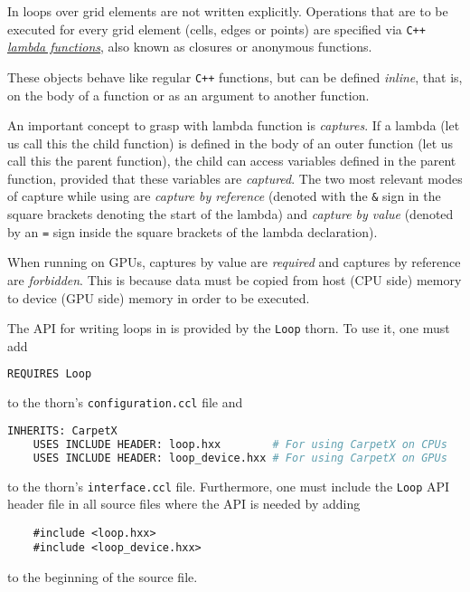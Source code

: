 In \CarpetX\space loops over grid elements are not written explicitly. Operations that are to be executed for every grid element (cells, edges or points) are specified via \texttt{C++} \href{https://en.cppreference.com/w/cpp/language/lambda}{\textit{lambda functions}}, also known as closures or anonymous functions.

These objects behave like regular \texttt{C++} functions, but can be defined \textit{inline}, that is, on the body of a function or as an argument to another function.

An important concept to grasp with lambda function is \textit{captures}. If a lambda (let us call this the child function) is defined in the body of an outer function (let us call this the parent function), the child can access variables defined in the parent function, provided that these variables are \textit{captured}. The two most relevant modes of capture while using \CarpetX\space are \textit{capture by reference} (denoted with the \texttt{\&} sign in the square brackets denoting the start of the lambda) and \textit{capture by value} (denoted by an \texttt{=} sign inside the square brackets of the lambda declaration).

When running on GPUs, captures by value are \textit{required} and captures by reference are \textit{forbidden}. This is because data must be copied from host (CPU side) memory to device (GPU side) memory in order to be executed.

The API for writing loops in \CarpetX\space is provided by the \texttt{Loop} thorn. To use it, one must add
%
\begin{lstlisting}[language=Bash]
    REQUIRES Loop
\end{lstlisting}
%
to the thorn's \texttt{configuration.ccl} file and
%
\begin{lstlisting}[language=Bash]
    INHERITS: CarpetX   
    USES INCLUDE HEADER: loop.hxx        # For using CarpetX on CPUs
    USES INCLUDE HEADER: loop_device.hxx # For using CarpetX on GPUs
\end{lstlisting}
%
to the thorn's \texttt{interface.ccl} file. Furthermore, one must include the \texttt{Loop} API header file in all source files where the API is needed by adding
%
\begin{lstlisting}
    #include <loop.hxx>
    #include <loop_device.hxx>
\end{lstlisting}
%
to the beginning of the source file.


